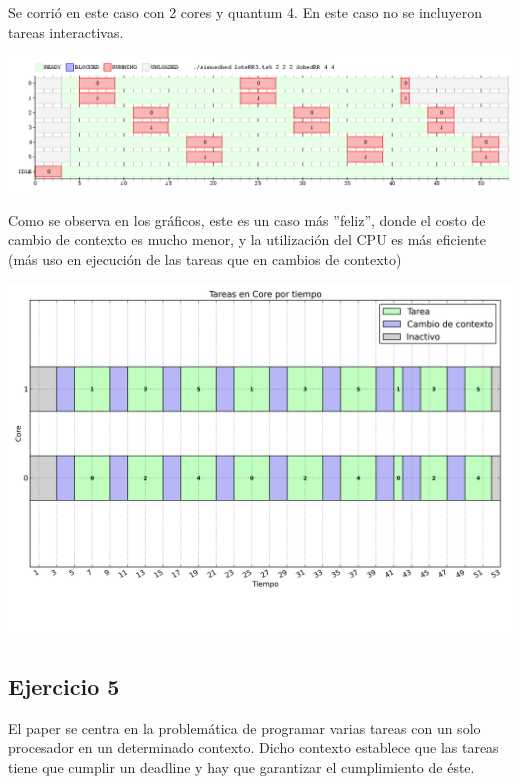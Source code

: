 Se corrió en este caso con 2 cores y quantum 4. En este caso no se incluyeron tareas interactivas.

\begin{center}
\includegraphics[scale=0.4]{graficos/rr_loteRR3.png}
\end{center}

Como se observa en los gráficos, este es un caso más ''feliz'', donde el costo de cambio de contexto es mucho menor, y la utilización del CPU es más eficiente (más uso en ejecución de las tareas que en cambios de contexto)

\begin{center}
\includegraphics[scale=0.4]{graficos/out_cores_timeline1.png}
\end{center}


\subsection{Ejercicio 5}

El paper\cite{liu1973scheduling} se centra en la problemática de programar varias tareas con un solo procesador en un determinado contexto.
Dicho contexto establece que las tareas tiene que cumplir un deadline y hay que garantizar el cumplimiento de \'este. \\


